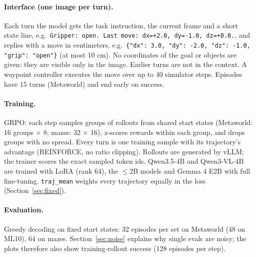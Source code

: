 \documentclass[11pt]{article}
\newcommand{\code}[1]{\texttt{#1}}
\begin{document}
\paragraph{Interface (one image per turn).}
Each turn the model gets the task instruction, the current frame and a short state line, e.g.\ \code{Gripper: open. Last
move: dx=+2.0, dy=-1.0, dz=+0.0.}, and replies with a move in centimeters, e.g.\ \code{\{"dx": 3.0, "dy": -2.0, "dz":
-1.0, "grip": "open"\}} (at most 10 cm). No coordinates of the goal or objects are given: they are visible only in the
image. Earlier turns are not in the context. A waypoint controller executes the move over up to 40 simulator steps.
Episodes have 15 turns (Metaworld) and end early on success.

\paragraph{Training.}
GRPO: each step samples groups of rollouts from shared start states (Metaworld: 16 groups $\times$ 8; mazes: 32
$\times$ 16), z-scores rewards within each group, and drops groups with no spread. Every turn is one training sample
with its trajectory's advantage (REINFORCE, no ratio clipping). Rollouts are generated by vLLM; the trainer scores the
exact sampled token ids. Qwen3.5-4B and Qwen3-VL-4B are trained with LoRA (rank 64), the $\le$2B models and Gemma 4 E2B
with full fine-tuning. \code{traj\_mean} weights every trajectory equally in the loss (Section~\ref{sec:fixed}).

\paragraph{Evaluation.}
Greedy decoding on fixed start states: 32 episodes per set on Metaworld (48 on ML10), 64 on mazes. Section~\ref{sec:noise}
explains why single evals are noisy; the plots therefore also show training-rollout success (128 episodes per step).
\end{document}

